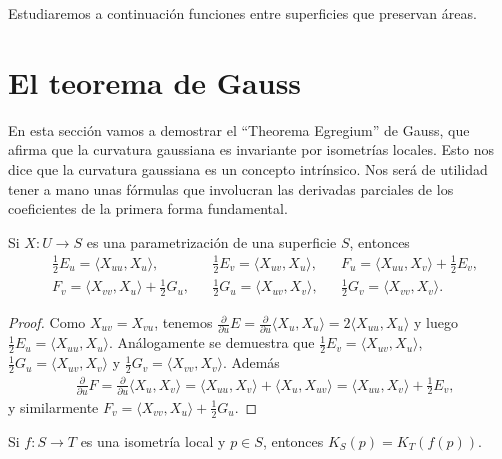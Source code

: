 Estudiaremos a continuación funciones entre superficies que preservan áreas. 

\chapter{El teorema de Gauss}

En esta sección vamos a demostrar el ``Theorema Egregium'' de Gauss, que afirma
que la curvatura gaussiana es invariante por isometrías locales. Esto nos dice
que la curvatura gaussiana es un concepto intrínsico.  Nos será de utilidad
tener a mano unas fórmulas que involucran las derivadas parciales de los
coeficientes de la primera forma fundamental.  

\begin{lemma}
Si $X\colon
U\to S$ es una parametrización de una superficie $S$, entonces
\begin{align*}
	&\frac12 E_u=\langle X_{uu},X_u\rangle,
	&&\frac12 E_v=\langle X_{uv},X_u\rangle,
	&&F_u=\langle X_{uu},X_v\rangle+\frac12E_v,\\
	&F_v=\langle X_{vv},X_u\rangle+\frac12G_u,
	&&\frac12 G_u=\langle X_{uv},X_v\rangle,
	&&\frac12 G_v=\langle X_{vv},X_v\rangle.
\end{align*}
\end{lemma}

\begin{proof}
	Como $X_{uv}=X_{vu}$, tenemos $\frac{\partial}{\partial u}E=
	\frac{\partial}{\partial u}\langle X_u,X_u\rangle=2\langle
	X_{uu},X_u\rangle$ y luego $\frac12 E_u=\langle X_{uu},X_u\rangle$.
	Análogamente se demuestra que $\frac12 E_v=\langle X_{uv},X_u\rangle$,
	$\frac12 G_u=\langle X_{uv},X_v\rangle$ y $\frac12 G_v=\langle
	X_{vv},X_v\rangle$. Además 
	\begin{align*}
		&\frac{\partial}{\partial u}F=
		\frac{\partial}{\partial u}\langle X_u,X_v\rangle=
		\langle X_{uu},X_v\rangle+\langle X_u,X_{uv}\rangle=
		\langle X_{uu},X_v\rangle+\frac12E_v,
	\end{align*}
	y similarmente $F_v=\langle X_{vv},X_u\rangle+\frac12G_u$.
\end{proof}

\begin{theorem}[Gauss]
	Si $f\colon S\to T$ es una isometría local y $p\in S$, entonces
	$K_S(p)=K_T(f(p))$.
\end{theorem}

